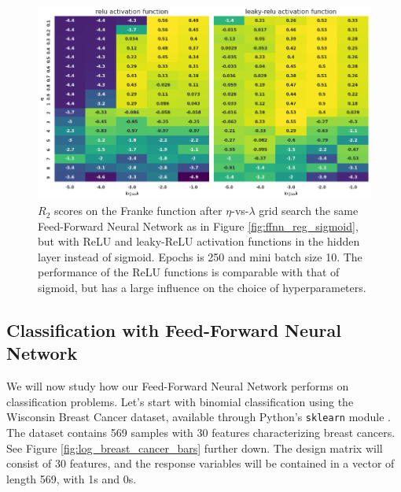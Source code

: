 \documentclass[]{article}
\begin{document}
\begin{figure}[!htb]
	\centering
	\includegraphics[width=1\linewidth]{ffnn_reg_relus.png}
	\caption{$R_2$ scores on the Franke function after $\eta$-vs-$\lambda$ grid search the same Feed-Forward Neural Network as in Figure \ref{fig:ffnn_reg_sigmoid}, but with ReLU and leaky-ReLU activation functions in the hidden layer instead of sigmoid. Epochs is 250 and mini batch size 10. The performance of the ReLU functions is comparable with that of sigmoid, but has a large influence on the choice of hyperparameters.}
	\label{fig:ffnn_reg_relus}
\end{figure}

\subsection{Classification with Feed-Forward Neural Network}


We will now study how our Feed-Forward Neural Network performs on classification problems. Let's start with binomial classification using the Wisconsin Breast Cancer dataset, available through Python's \lstinline|sklearn| module \cite{skl-datasets}. The dataset contains 569 samples with 30 features characterizing breast cancers. See Figure \ref{fig:log_breast_cancer_bars} further down. The design matrix will consist of 30 features, and the response variables will be contained in a vector of length 569, with 1s and 0s. 
\end{document}
